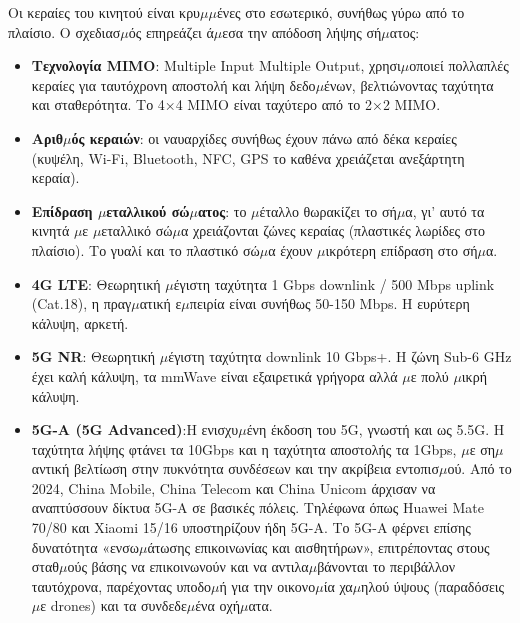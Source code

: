 
Οι κεραίες του κινητού είναι κρυ$\mu$$\mu$ένες στο εσωτερικό, συνήθως γύρω από το πλαίσιο. Ο σχεδιασ$\mu$ός επηρεάζει ά$\mu$εσα την απόδοση λήψης σή$\mu$ατος:

\begin{itemize}
  \item \textbf{Τεχνολογία MIMO}: Multiple Input Multiple Output, χρησι$\mu$οποιεί πολλαπλές κεραίες για ταυτόχρονη αποστολή και λήψη δεδο$\mu$ένων, βελτιώνοντας ταχύτητα και σταθερότητα. Το 4×4 MIMO είναι ταχύτερο από το 2×2 MIMO.
  \item \textbf{Αριθ$\mu$ός κεραιών}: οι ναυαρχίδες συνήθως έχουν πάνω από δέκα κεραίες (κυψέλη, Wi-Fi, Bluetooth, NFC, GPS το καθένα χρειάζεται ανεξάρτητη κεραία).
  \item \textbf{Επίδραση $\mu$εταλλικού σώ$\mu$ατος}: το $\mu$έταλλο θωρακίζει το σή$\mu$α, γι' αυτό τα κινητά $\mu$ε $\mu$εταλλικό σώ$\mu$α χρειάζονται ζώνες κεραίας (πλαστικές λωρίδες στο πλαίσιο). Το γυαλί και το πλαστικό σώ$\mu$α έχουν $\mu$ικρότερη επίδραση στο σή$\mu$α.
\end{itemize}


\begin{itemize}
  \item \textbf{4G LTE}: Θεωρητική $\mu$έγιστη ταχύτητα 1 Gbps downlink / 500 Mbps uplink (Cat.18), η πραγ$\mu$ατική ε$\mu$πειρία είναι συνήθως 50-150 Mbps. Η ευρύτερη κάλυψη, αρκετή.
  \item \textbf{5G NR}: Θεωρητική $\mu$έγιστη ταχύτητα downlink 10 Gbps+. Η ζώνη Sub-6 GHz έχει καλή κάλυψη, τα mmWave είναι εξαιρετικά γρήγορα αλλά $\mu$ε πολύ $\mu$ικρή κάλυψη.
  \item \textbf{5G-A (5G Advanced)}:Η ενισχυ$\mu$ένη έκδοση του 5G, γνωστή και ως 5.5G. Η ταχύτητα λήψης φτάνει τα 10Gbps και η ταχύτητα αποστολής τα 1Gbps, $\mu$ε ση$\mu$αντική βελτίωση στην πυκνότητα συνδέσεων και την ακρίβεια εντοπισ$\mu$ού. Από το 2024, China Mobile, China Telecom και China Unicom άρχισαν να αναπτύσσουν δίκτυα 5G-A σε βασικές πόλεις. Τηλέφωνα όπως Huawei Mate 70/80 και Xiaomi 15/16 υποστηρίζουν ήδη 5G-A. Το 5G-A φέρνει επίσης δυνατότητα «ενσω$\mu$άτωσης επικοινωνίας και αισθητήρων», επιτρέποντας στους σταθ$\mu$ούς βάσης να επικοινωνούν και να αντιλα$\mu$βάνονται το περιβάλλον ταυτόχρονα, παρέχοντας υποδο$\mu$ή για την οικονο$\mu$ία χα$\mu$ηλού ύψους (παραδόσεις $\mu$ε drones) και τα συνδεδε$\mu$ένα οχή$\mu$ατα.
\end{itemize}

